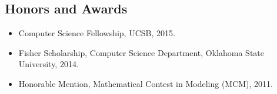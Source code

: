 \documentclass{res}
\begin{document}
\begin{resume}
%
%
%

\section{\sc Honors and Awards}
\begin{itemize}
\item Computer Science Fellowship, UCSB, 2015.
\item Fisher Scholarship, Computer Science Department, Oklahoma State University, 2014.
\item Honorable Mention, Mathematical Contest in Modeling (MCM), 2011.
\end{itemize}

\end{resume}
\end{document}
